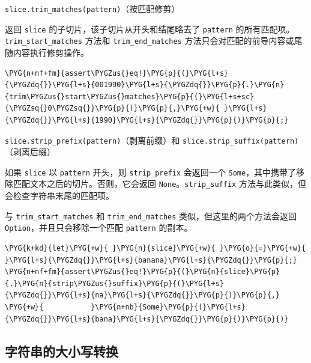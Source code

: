 \begin{myNote}
\texttt{slice.trim\_matches(pattern)}（按匹配修剪）
\end{myNote}

返回 \texttt{slice} 的子切片，该子切片从开头和结尾略去了 \texttt{pattern} 的所有匹配项。\texttt{trim\_start\_matches} 方法和 \texttt{trim\_end\_matches} 方法只会对匹配的前导内容或尾随内容执行修剪操作。

\begin{Verbatim}[commandchars=\\\{\},breaklines=true,breakanywhere=true,fontsize=\codefont,xleftmargin=17bp]
\PYG{n+nf+fm}{assert\PYGZus{}eq!}\PYG{p}{(}\PYG{l+s}{\PYGZdq{}}\PYG{l+s}{001990}\PYG{l+s}{\PYGZdq{}}\PYG{p}{.}\PYG{n}{trim\PYGZus{}start\PYGZus{}matches}\PYG{p}{(}\PYG{l+s+sc}{\PYGZsq{}0\PYGZsq{}}\PYG{p}{)}\PYG{p}{,}\PYG{+w}{ }\PYG{l+s}{\PYGZdq{}}\PYG{l+s}{1990}\PYG{l+s}{\PYGZdq{}}\PYG{p}{)}\PYG{p}{;}
\end{Verbatim}

\begin{myNote}
\texttt{slice.strip\_prefix(pattern)}（剥离前缀）和 \texttt{slice.strip\_suffix(pattern)}（剥离后缀）
\end{myNote}

如果 \texttt{slice} 以 \texttt{pattern} 开头，则 \texttt{strip\_prefix} 会返回一个 \texttt{Some}，其中携带了移除匹配文本之后的切片。否则，它会返回 \texttt{None}。\texttt{strip\_suffix} 方法与此类似，但会检查字符串末尾的匹配项。

与 \texttt{trim\_start\_matches} 和 \texttt{trim\_end\_matches} 类似，但这里的两个方法会返回 \texttt{Option}，并且只会移除一个匹配 \texttt{pattern} 的副本。

\begin{Verbatim}[commandchars=\\\{\},breaklines=true,breakanywhere=true,fontsize=\codefont,xleftmargin=17bp]
\PYG{k+kd}{let}\PYG{+w}{ }\PYG{n}{slice}\PYG{+w}{ }\PYG{o}{=}\PYG{+w}{ }\PYG{l+s}{\PYGZdq{}}\PYG{l+s}{banana}\PYG{l+s}{\PYGZdq{}}\PYG{p}{;}
\PYG{n+nf+fm}{assert\PYGZus{}eq!}\PYG{p}{(}\PYG{n}{slice}\PYG{p}{.}\PYG{n}{strip\PYGZus{}suffix}\PYG{p}{(}\PYG{l+s}{\PYGZdq{}}\PYG{l+s}{na}\PYG{l+s}{\PYGZdq{}}\PYG{p}{)}\PYG{p}{,}
\PYG{+w}{           }\PYG{n+nb}{Some}\PYG{p}{(}\PYG{l+s}{\PYGZdq{}}\PYG{l+s}{bana}\PYG{l+s}{\PYGZdq{}}\PYG{p}{)}\PYG{p}{)}
\end{Verbatim}

\subsection{字符串的大小写转换}

